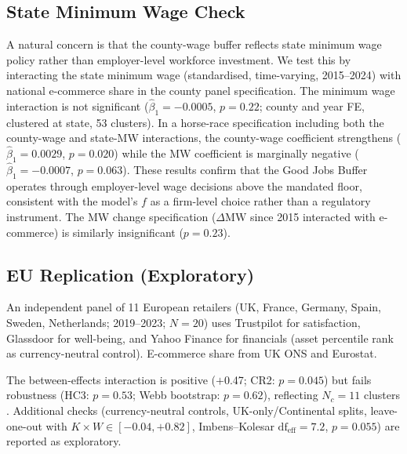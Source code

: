 \documentclass[msom,dblanonrev]{informs4}
\begin{document}
{\subsection*{State Minimum Wage Check}

A natural concern is that the county-wage buffer reflects state minimum wage policy rather than employer-level workforce investment. We test this by interacting the state minimum wage (standardised, time-varying, 2015--2024) with national e-commerce share in the county panel specification. The minimum wage interaction is not significant ($\hat{\beta}_1 = -0.0005$, $p = 0.22$; county and year FE, clustered at state, 53 clusters). In a horse-race specification including both the county-wage and state-MW interactions, the county-wage coefficient strengthens ($\hat{\beta}_1 = 0.0029$, $p = 0.020$) while the MW coefficient is marginally negative ($\hat{\beta}_1 = -0.0007$, $p = 0.063$). These results confirm that the Good Jobs Buffer operates through employer-level wage decisions above the mandated floor, consistent with the model's $f$ as a firm-level choice rather than a regulatory instrument. The MW change specification ($\Delta\mathrm{MW}$ since 2015 interacted with e-commerce) is similarly insignificant ($p = 0.23$).

\subsection*{EU Replication (Exploratory)}

An independent panel of 11 European retailers (UK, France, Germany, Spain, Sweden, Netherlands; 2019--2023; $N{=}20$) uses Trustpilot for satisfaction, Glassdoor for well-being, and Yahoo Finance for financials (asset percentile rank as currency-neutral control). E-commerce share from UK ONS and Eurostat.

The between-effects interaction is positive ($+$0.47; CR2: $p = 0.045$) but fails robustness (HC3: $p = 0.53$; Webb bootstrap: $p = 0.62$), reflecting $N_c = 11$ clusters \citep{cameron2008bootstrap, webb2023reworking}. Additional checks (currency-neutral controls, UK-only/Continental splits, leave-one-out with $K{\times}W \in [-0.04, +0.82]$, Imbens--Kolesar $\mathrm{df}_{\mathrm{eff}}{=}7.2$, $p{=}0.055$) are reported as exploratory.
}%
\end{document}
